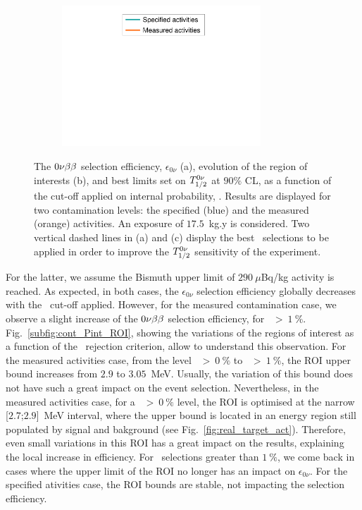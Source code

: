 \begin{figure}[!h]
\begin{subfigure}[t]{0.49\textwidth}
  \captionsetup{justification=justified}
  \caption{
    \label{subfig:cont_Pint_T12}}
\end{subfigure}
\hfill
\begin{subfigure}[t]{0.49\textwidth}
  \centering
  \includegraphics[width=0.82\textwidth]{Sensitivity/fig_sensitivity/legend_cut_Pint.pdf}
  \end{subfigure}
\caption{The $0\nu\beta\beta$ selection efficiency, $\epsilon_{0\nu}$ (a),
  evolution of the region of interests (b),
  and best limits set on $T_{1/2}^{0\nu}$ at $90\%$ CL, as a function of the cut-off applied on internal probability, \Pint.
  Results are displayed for two contamination levels: the specified (blue) and the measured (orange) activities.
  An exposure of $17.5$~kg.y is considered.
  Two vertical dashed lines in (a) and (c) display the best \Pint\ selections to be applied in order to improve the $T_{1/2}^{0\nu}$ sensitivity of the experiment.
  \label{fig:cont_Pint}}
\end{figure}
For the latter, we assume the Bismuth upper limit of $290~\mu$Bq/kg activity is reached.
As expected, in both cases, the $\epsilon_{0\nu}$ selection efficiency globally decreases with the \Pint\ cut-off applied.
However, for the measured contamination case, we observe a slight increase of the $0\nu\beta\beta$ selection efficiency, for \Pint\ $>~1~\%$.
Fig.~\ref{subfig:cont_Pint_ROI}, showing the variations of the regions of interest as a function of the \Pint\ rejection criterion, allow to understand this observation.
For the measured activities case, from the level \Pint~$>~0~\%$ to \Pint~$>~1~\%$, the ROI upper bound increases from $2.9$ to $3.05$~MeV.
Usually, the variation of this bound does not have such a great impact on the event selection.
Nevertheless, in the measured activities case, for a \Pint~$>~0~\%$ level, the ROI is optimised at the narrow [$2.7$;$2.9$]~MeV interval, where the upper bound is located in an energy region still populated by signal and bakground (see Fig.~\ref{fig:real_target_act}).
Therefore, even small variations in this ROI has a great impact on the results, explaining the local increase in efficiency.
For \Pint\ selections greater than $1~\%$, we come back in cases where the upper limit of the ROI no longer has an impact on $\epsilon_{0\nu}$.
For the specified ativities case, the ROI bounds are stable, not impacting the selection efficiency.

